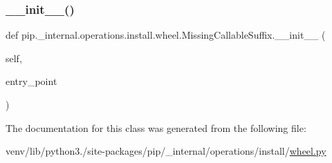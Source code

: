\subsubsection{\texorpdfstring{\+\_\+\+\_\+init\+\_\+\+\_\+()}{\_\_init\_\_()}}
{\footnotesize\ttfamily def pip.\+\_\+internal.\+operations.\+install.\+wheel.\+Missing\+Callable\+Suffix.\+\_\+\+\_\+init\+\_\+\+\_\+ (\begin{DoxyParamCaption}\item[{}]{self,  }\item[{}]{entry\+\_\+point }\end{DoxyParamCaption})}



The documentation for this class was generated from the following file\+:\begin{DoxyCompactItemize}
\item 
venv/lib/python3./site-\/packages/pip/\+\_\+internal/operations/install/\hyperlink{pip_2__internal_2operations_2install_2wheel_8py}{wheel.\+py}\end{DoxyCompactItemize}
